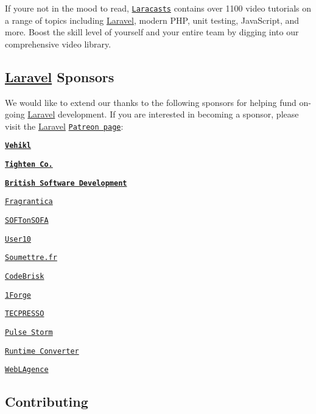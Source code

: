 If you\textquotesingle{}re not in the mood to read, \href{https://laracasts.com}{\tt Laracasts} contains over 1100 video tutorials on a range of topics including \mbox{\hyperlink{namespace_laravel}{Laravel}}, modern P\+HP, unit testing, Java\+Script, and more. Boost the skill level of yourself and your entire team by digging into our comprehensive video library.

\subsection*{\mbox{\hyperlink{namespace_laravel}{Laravel}} Sponsors}

We would like to extend our thanks to the following sponsors for helping fund on-\/going \mbox{\hyperlink{namespace_laravel}{Laravel}} development. If you are interested in becoming a sponsor, please visit the \mbox{\hyperlink{namespace_laravel}{Laravel}} \href{https://patreon.com/taylorotwell}{\tt Patreon page}\+:


\begin{DoxyItemize}
\item {\bfseries \href{https://vehikl.com/}{\tt Vehikl}}
\item {\bfseries \href{https://tighten.co}{\tt Tighten Co.}}
\item {\bfseries \href{https://www.britishsoftware.co}{\tt British Software Development}}
\item \href{https://www.fragrantica.com}{\tt Fragrantica}
\item \href{https://softonsofa.com/}{\tt S\+O\+F\+Ton\+S\+O\+FA}
\item \href{https://user10.com}{\tt User10}
\item \href{https://soumettre.fr/}{\tt Soumettre.\+fr}
\item \href{https://codebrisk.com}{\tt Code\+Brisk}
\item \href{https://1forge.com}{\tt 1\+Forge}
\item \href{https://tecpresso.co.jp/}{\tt T\+E\+C\+P\+R\+E\+S\+SO}
\item \href{http://www.pulsestorm.net/}{\tt Pulse Storm}
\item \href{http://runtimeconverter.com/}{\tt Runtime Converter}
\item \href{https://weblagence.com/}{\tt WebL\textquotesingle{}Agence}
\end{DoxyItemize}

\subsection*{Contributing}

